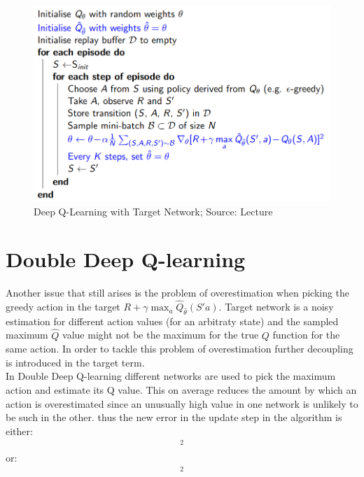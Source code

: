 \begin{figure}[H]
\centering
\includegraphics[scale=0.4]{figures/dqn wth target.PNG}
  \caption{Deep Q-Learning with Target Network; Source: Lecture}
  \label{fig:target_network_algorithm}
\end{figure}

\section{Double Deep Q-learning}
Another issue that still arises is the problem of overestimation when picking the greedy action in the target $R + \gamma \max_a \hat{Q}_{\hat{\theta}}(S' a)$. Target network is a noisy estimation for different action values (for an arbitraty state) and the sampled maximum $\hat{Q}$ value might not be the maximum for the true $Q$ function for the same action. In order to tackle this problem of overestimation 
further decoupling is introduced in the target term.\\

In Double Deep Q-learning different networks are used to pick the maximum action and estimate its Q value. This on average reduces the amount by which an action is overestimated since an unusually high value in one network is unlikely to be such in the other. thus the new error in the update step in the algorithm is either:
\begin{align}
    [R + \gamma Q_{\theta}(S', \text{arg}\max_a\ \hat{Q}_{\hat{\theta}}(S', a)) - Q_{\theta}(S, A)]^2
\end{align}
or:
\begin{align}
    [R + \gamma \hat{Q}_{\hat{\theta}}(S', \text{arg}\max_a\ Q_{\theta}(S', a)) - Q_{\theta}(S, A)]^2
\end{align}


